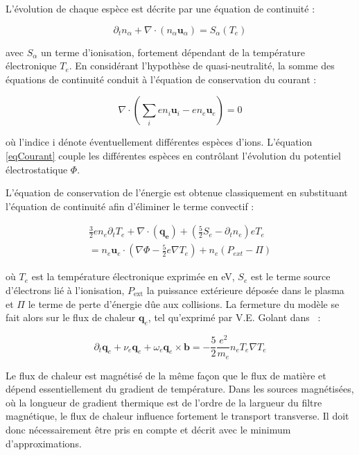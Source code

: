 \begin{refsection}
L'évolution de chaque espèce est décrite par une équation de continuité :

\begin{equation}
\label{3-continuite}
\partial_t n_\alpha +
\nabla\cdot\left(n_\alpha\mathbf{u}_\alpha\right)=S_\alpha(T_e)
\end{equation}

avec $S_\alpha$ un terme d'ionisation, fortement dépendant de la
température électronique $T_e$. En considérant l'hypothèse de quasi-neutralité, la somme des
équations de continuité conduit à l'équation de conservation du courant :

\begin{equation}
\label{eqCourant}
\nabla\cdot(\sum_ien_i\mathbf{u}_i-en_e\mathbf{u}_e)=0
\end{equation}

où l'indice i dénote éventuellement différentes espèces d'ions. 
L'équation \eqref{eqCourant} couple les différentes espèces en contrôlant
l'évolution du potentiel électrostatique $\Phi$.

L'équation de conservation de l'énergie est obtenue classiquement en substituant
l'équation de continuité afin d'éliminer le terme convectif :

\begin{equation}\begin{split}
\label{3-energie}
\frac{3}{2}en_e\partial_tT_e + \nabla\cdot(\mathbf{q_e}) +
(\frac{5}{2}S_e-\partial_tn_e)eT_e \\=n_e\mathbf{u}_e\cdot(\nabla
\Phi-\frac{5}{2}e\nabla T_e)+n_e\left(P_{ext}-\Pi\right)
\end{split}
\end{equation}

où $T_e$ est la température électronique exprimée en eV, $S_e$ est le
terme source d'électrons lié à l'ionisation, $P_\text{ext}$ la puissance
extérieure déposée dans le plasma et $\Pi$ le terme de perte d'énergie dûe aux
collisions. La fermeture du modèle se fait alors sur le flux de chaleur
$\mathbf{q}_e$, tel qu'exprimé par
V.E. Golant dans~\cite{Golant} :

\begin{equation}
\partial_t \mathbf{q}_e + \nu_e\mathbf{q}_e+\omega_e\mathbf{q}_e\times\mathbf{b} =
-\frac{5}{2}\frac{e^2}{m_e}n_eT_e\nabla T_e
\end{equation}

Le flux de chaleur est magnétisé de la même façon que le flux de matière et
dépend essentiellement du gradient de température. Dans les sources magnétisées,
où la longueur de gradient thermique est de l'ordre de la largueur
du filtre magnétique, le flux de chaleur influence fortement le transport
transverse. Il doit donc nécessairement être pris en compte et décrit
avec le minimum d'approximations.


\end{refsection}
